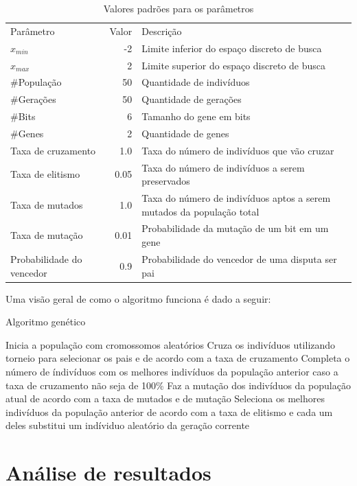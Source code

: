 \documentclass[11pt]{article}
\begin{document}
\begin{table}[htbp]
\caption{Valores padrões para os parâmetros}
\centering
\begin{tabular}{lrl}
Parâmetro & Valor & Descrição\\
\(x_{min}\) & -2 & Limite inferior do espaço discreto de busca\\
\(x_{max}\) & 2 & Limite superior do espaço discreto de busca\\
\#População & 50 & Quantidade de indivíduos\\
\#Gerações & 50 & Quantidade de gerações\\
\#Bits & 6 & Tamanho do gene em bits\\
\#Genes & 2 & Quantidade de genes\\
Taxa de cruzamento & 1.0 & Taxa do número de indivíduos que vão cruzar\\
Taxa de elitismo & 0.05 & Taxa do número de indivíduos a serem preservados\\
Taxa de mutados & 1.0 & Taxa do número de indivíduos aptos a serem mutados da população total\\
Taxa de mutação & 0.01 & Probabilidade da mutação de um bit em um gene\\
Probabilidade do vencedor & 0.9 & Probabilidade do vencedor de uma disputa ser pai\\
\end{tabular}
\end{table}


Uma visão geral de como o algoritmo funciona é dado a seguir:
\begin{algorithm}
  \caption{Algoritmo genético}
  \begin{algorithmic}[1]
  \State Inicia a população com cromossomos aleatórios
  \State Cruza os indivíduos utilizando torneio para selecionar os pais e de acordo com a taxa de cruzamento
  \State Completa o número de índivíduos com os melhores indivíduos da população anterior caso a taxa de cruzamento não seja de 100\%
  \State Faz a mutação dos indivíduos da população atual de acordo com a taxa de mutados e de mutação
  \State Seleciona os melhores indivíduos da população anterior de acordo com a taxa de elitismo e cada um deles substitui um indíviduo aleatório da geração corrente
  \EndFor
  \end{algorithmic}
\end{algorithm}


\section{Análise de resultados}
\label{sec:orgccef280}
\end{document}
